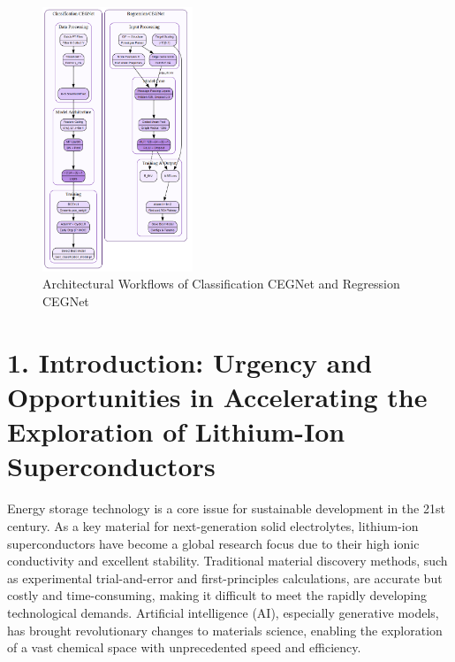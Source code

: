 \documentclass[letterpaper]{article} %
\begin{document}
\begin{figure}[htbp]  %
    \centering  %
    \includegraphics[width=0.4\textwidth]{2.png}  %
    \caption{Architectural Workflows of Classification CEGNet and Regression CEGNet}  %
\end{figure}
\section{1. Introduction: Urgency and Opportunities in Accelerating the Exploration of Lithium-Ion Superconductors}

Energy storage technology is a core issue for sustainable development in the 21st century. As a key material for next-generation solid electrolytes, lithium-ion superconductors have become a global research focus due to their high ionic conductivity and excellent stability. Traditional material discovery methods, such as experimental trial-and-error and first-principles calculations, are accurate but costly and time-consuming, making it difficult to meet the rapidly developing technological demands. Artificial intelligence (AI), especially generative models, has brought revolutionary changes to materials science, enabling the exploration of a vast chemical space with unprecedented speed and efficiency.
\end{document}
